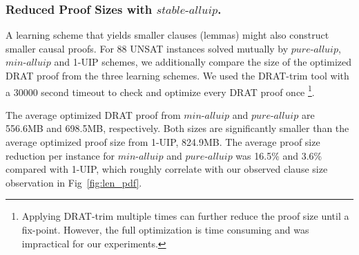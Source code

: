 \documentclass[runningheads]{llncs}
\newcommand{\oneuip}{1-UIP\xspace}
\newcommand{\stablealluip}{\textit{stable-alluip}\xspace}
\newcommand{\allUipPure}{\textit{pure-alluip}\xspace}
\newcommand{\allUipMin}{\textit{min-alluip}\xspace}
\newcommand{\MapleBase}{\textit{MapleCOMSPS\_LRB}}
\newcommand{\MapleIUIPPure}{\text{Maple-\allUipPure}}
\newcommand{\MapleIUIMin}{\text{Maple-\allUipMin}}
\begin{document}
\subsubsection{Reduced Proof Sizes with $\stablealluip$.}
A learning scheme that yields smaller clauses (lemmas) might also
construct smaller causal proofs. For 88 UNSAT instances solved mutually
by $\allUipPure$, $\allUipMin$ and \oneuip schemes, we additionally
compare the size of the optimized DRAT proof from the three learning schemes. 
We used the DRAT-trim tool
\cite{DBLP:conf/sat/WetzlerHH14} with a 30000 second timeout to check and
optimize every DRAT proof once \footnote{Applying DRAT-trim multiple
  times can further reduce the proof size until a fix-point. However,
  the full optimization is time consuming and was impractical for our
  experiments.}.

The average optimized DRAT proof from $\allUipMin$ and $\allUipPure$
are 556.6MB and 698.5MB, respectively. Both sizes are significantly
smaller than the average optimized proof size from \oneuip, 824.9MB.
The average proof size reduction per instance for $\allUipMin$ and
$\allUipPure$ was 16.5\% and 3.6\% compared with \oneuip, which roughly
correlate with our observed clause size observation in
Fig~\ref{fig:len_pdf}.


\end{document}
